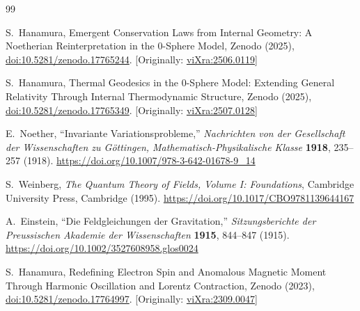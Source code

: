 \documentclass[%
 reprint,
 amsmath,amssymb,
 aps,
]{revtex4-1}
\numberwithin{equation}{section}%
\begin{document}
\begin{thebibliography}{99}

S.~Hanamura, Emergent Conservation Laws from Internal Geometry: A Noetherian Reinterpretation in the 0-Sphere Model, Zenodo (2025), \href{https://doi.org/10.5281/zenodo.17765244}{doi:10.5281/zenodo.17765244}. [Originally: \href{https://vixra.org/abs/2506.0119}{viXra:2506.0119}]

S.~Hanamura, Thermal Geodesics in the 0-Sphere Model: Extending General Relativity Through Internal Thermodynamic Structure, Zenodo (2025), \href{https://doi.org/10.5281/zenodo.17765349}{doi:10.5281/zenodo.17765349}. [Originally: \href{https://vixra.org/abs/2507.0128}{viXra:2507.0128}]

E.~Noether, 
``Invariante Variationsprobleme,'' 
\textit{Nachrichten von der Gesellschaft der Wissenschaften zu Göttingen, Mathematisch-Physikalische Klasse} \textbf{1918}, 235--257 (1918).
\href{https://doi.org/10.1007/978-3-642-01678-9_14}{https://doi.org/10.1007/978-3-642-01678-9\_14}

S.~Weinberg, 
\textit{The Quantum Theory of Fields, Volume I: Foundations}, 
Cambridge University Press, Cambridge (1995).
\href{https://doi.org/10.1017/CBO9781139644167}{https://doi.org/10.1017/CBO9781139644167}

A.~Einstein, 
``Die Feldgleichungen der Gravitation,'' 
\textit{Sitzungsberichte der Preussischen Akademie der Wissenschaften} \textbf{1915}, 844--847 (1915).
\href{https://doi.org/10.1002/3527608958.glos0024}{https://doi.org/10.1002/3527608958.glos0024}

S.~Hanamura, Redefining Electron Spin and Anomalous Magnetic Moment Through Harmonic Oscillation and Lorentz Contraction, Zenodo (2023), \href{https://doi.org/10.5281/zenodo.17764997}{doi:10.5281/zenodo.17764997}. [Originally: \href{https://vixra.org/abs/2309.0047}{viXra:2309.0047}]


\end{thebibliography}
\end{document}
